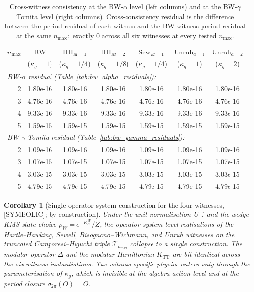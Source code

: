 \documentclass[11pt,a4paper]{article}
\theoremstyle{plain}
\newtheorem{corollary}[theorem]{Corollary}
\theoremstyle{definition}
\newcommand{\nmax}{n_{\max}}
\newcommand{\Tcal}{\mathcal{T}}
\newcommand{\TT}{\mathrm{TT}}
\newcommand{\BW}{\mathrm{BW}}
\newcommand{\HH}{\mathrm{HH}}
\newcommand{\Sew}{\mathrm{Sew}}
\newcommand{\Unruh}{\mathrm{Unruh}}
\begin{document}
\begin{table}[ht]
\centering
\caption{Cross-witness consistency at the BW-$\alpha$ level
(left columns) and at the BW-$\gamma$ Tomita level (right columns).
Cross-consistency residual is the difference between the period
residual of each witness and the BW-witness period residual at the
same $\nmax$:\ exactly $0$ across all six witnesses
at every tested $\nmax$.}
\label{tab:cross_witness}
\renewcommand{\arraystretch}{1.1}
\setlength{\tabcolsep}{4pt}
\begin{tabular}{rcccccc}
\toprule
$\nmax$ & $\BW$ & $\HH_{M=1}$ & $\HH_{M=2}$ & $\Sew_{M=1}$ & $\Unruh_{a=1}$ & $\Unruh_{a=2}$ \\
& ($\kappa_g\!=\!1$) & ($\kappa_g\!=\!1/4$) & ($\kappa_g\!=\!1/8$) & ($\kappa_g\!=\!1/4$) & ($\kappa_g\!=\!1$) & ($\kappa_g\!=\!2$) \\
\midrule
\multicolumn{7}{l}{\emph{BW-$\alpha$ residual (Table~\ref{tab:bw_alpha_residuals}):}} \\
2 & 1.80e-16 & 1.80e-16 & 1.80e-16 & 1.80e-16 & 1.80e-16 & 1.80e-16 \\
3 & 4.76e-16 & 4.76e-16 & 4.76e-16 & 4.76e-16 & 4.76e-16 & 4.76e-16 \\
4 & 9.33e-16 & 9.33e-16 & 9.33e-16 & 9.33e-16 & 9.33e-16 & 9.33e-16 \\
5 & 1.59e-15 & 1.59e-15 & 1.59e-15 & 1.59e-15 & 1.59e-15 & 1.59e-15 \\
\midrule
\multicolumn{7}{l}{\emph{BW-$\gamma$ Tomita residual (Table~\ref{tab:bw_gamma_residuals}):}} \\
2 & 1.09e-16 & 1.09e-16 & 1.09e-16 & 1.09e-16 & 1.09e-16 & 1.09e-16 \\
3 & 1.07e-15 & 1.07e-15 & 1.07e-15 & 1.07e-15 & 1.07e-15 & 1.07e-15 \\
4 & 3.03e-15 & 3.03e-15 & 3.03e-15 & 3.03e-15 & 3.03e-15 & 3.03e-15 \\
5 & 4.79e-15 & 4.79e-15 & 4.79e-15 & 4.79e-15 & 4.79e-15 & 4.79e-15 \\
\bottomrule
\end{tabular}
\end{table}

\begin{corollary}[Single operator-system construction for the four
witnesses, {[SYMBOLIC]}; by construction]\label{cor:single_construction}
Under the unit normalisation U-1 and the wedge KMS state choice
$\rho_W = e^{-K_\alpha^W}/Z$, the operator-system-level realisations of
the Hartle--Hawking, Sewell, Bisognano--Wichmann, and Unruh witnesses
on the truncated Camporesi--Higuchi triple $\Tcal_{\nmax}$ collapse to
a single construction. The modular operator $\Delta$ and the modular
Hamiltonian $K_{\TT}$ are bit-identical across the six witness
instantiations. The witness-specific physics enters only through the
parameterisation of $\kappa_g$, which is invisible at the
algebra-action level and at the period closure $\sigma_{2\pi}(O) = O$.
\end{corollary}
\end{document}
